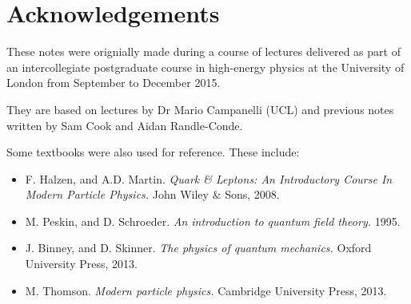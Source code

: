 \chapter*{Acknowledgements}
These notes were orignially made during a course of lectures delivered as part of an intercollegiate postgraduate course in high-energy physics at the University of London from September to December 2015.

They are based on lectures by Dr Mario Campanelli (UCL) and previous notes written by Sam Cook and Aidan Randle-Conde.

Some textbooks were also used for reference. These include:
\begin{itemize}
  \item F. Halzen, and A.D. Martin. \textsl{Quark & Leptons: An Introductory Course In Modern Particle Physics.} John Wiley & Sons, 2008.
  \item M. Peskin, and D. Schroeder. \textsl{An introduction to quantum field theory.} 1995.
  \item J. Binney, and D. Skinner. \textsl{The physics of quantum mechanics.} Oxford University Press, 2013.
  \item M. Thomson. \textsl{Modern particle physics.} Cambridge University Press, 2013.
\end{itemize}
